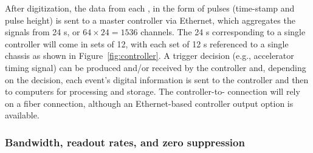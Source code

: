 After digitization, the data from each , in the form of pulses (time-stamp and pulse height) is sent to a master controller via Ethernet, which aggregates the signals from 24 s, or $64 \times 24=1536$ channels. The 24 s corresponding to a single controller will come in sets of 12, with each set of 12 s referenced to a single chassis as shown in %
Figure~\ref{fig:controller}. A trigger decision (e.g., accelerator timing signal) can be produced and/or received by the controller and, depending on the decision, each event's digital information is sent to the controller and then to  computers for processing and storage. The controller-to- connection will rely on a fiber connection, although an Ethernet-based controller output option is available.


 
\subsubsection{Bandwidth, readout rates, and zero suppression}

